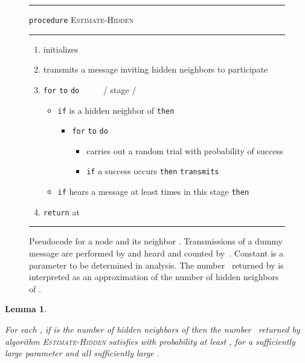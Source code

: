 \documentclass[11pt]{article}
\newcommand{\FF}{\vspace*{\medskipamount}}
\newtheorem{lemma}{Lemma}
\begin{document}
\begin{figure}[t]

\hrule

\FF

\noindent
\texttt{procedure} \textsc{Estimate-Hidden} 

\FF

\hrule

\FF

\begin{enumerate}[nosep]
\item
 initializes 
\item
 transmits a message inviting hidden neighbors to participate 
\item
\texttt{for}  \texttt{to}  \texttt{do} ~ ~ ~ / stage  /
\begin{itemize}[nosep]
\item[]
\texttt{if}  is a hidden neighbor of  \texttt{then}
\begin{itemize}[nosep]
\item[]
\texttt{for}  \texttt{to}  \texttt{do} 
\begin{itemize}[nosep]
\item[]
 carries out a random trial with probability  of success
\item[]
\texttt{if} a success occurs \texttt{then}  \texttt{transmits}
\end{itemize}
\end{itemize}
\item[]
\texttt{if}  hears a message at least  times in this stage
\texttt{then} 
\end{itemize}
\item
\texttt{return}  at 
\end{enumerate}

\FF

\hrule

\caption{\label{alg:estimate-hidden}
Pseudocode for a node  and its neighbor .
Transmissions of a dummy message are performed by  and heard and counted by~.
Constant  is a parameter to be determined in analysis.
The number~ returned by  is interpreted as an approximation  of the number of hidden neighbors of .}
\end{figure}





\begin{lemma}
\label{lem:hidden}

For each , if  is the number of hidden neighbors of  then the number~ returned by algorithm \textsc{Estimate-Hidden} satisfies   with probability at least , for a sufficiently large parameter  and all sufficiently large .
\end{lemma}
\end{document}
